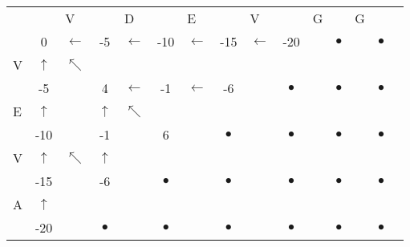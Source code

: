 \documentclass[landscape]{foils}
\begin{document}
\myNewSlide
{
\normalsize
\begin{center}
\begin{tabular}{lclclclclclclcl}
   &              & V             &  & D & & E & & V & & G & & G \\   
   & {\color{black} 0}      & {\color{green}$\leftarrow$}   & -5 &   {\color{green}$\leftarrow$} & -10 &   {\color{green}$\leftarrow$} & -15 &   {\color{green}$\leftarrow$} & -20&    & {\color{black}$\bullet$}&    & {\color{black}$\bullet$} \\
V  & {\color{green} $\uparrow$} & {\color{green}$\nwarrow$}    & {\color{black} $$ } &     & {\color{black} $$ } & {\color{black} $$} &     & {\color{black} $$ } &     & {\color{black} $$ } & {\color{black} $$} &     & {\color{black} $$ } &       \\
   & -5     &  & 4        &   {\color{green}$\leftarrow$} & -1 &   {\color{green} $\leftarrow$} & -6&    & {\color{black}$\bullet$}&    & {\color{black}$\bullet$}&    & {\color{black}$\bullet$} \\
E  & {\color{green} $\uparrow$} &     & {\color{green} $\uparrow$ } & {\color{green}$\nwarrow$}    & {\color{black} $$ } & {\color{black} $$} &     & {\color{black} $$ } &     & {\color{black} $$ } & {\color{black} $$} &     & {\color{black} $$ } &       \\
   & -10 &    & -1        &    & 6 &    & {\color{black}$\bullet$}&    & {\color{black}$\bullet$}&    & {\color{black}$\bullet$}&    & {\color{black}$\bullet$} \\
V  & {\color{green} $\uparrow$} & {\color{green} $\nwarrow$}    & {\color{green} $\uparrow$} &     & {\color{black} $$ } & {\color{black} $$} &     & {\color{black} $$ } &     & {\color{black} $$ } & {\color{black} $$} &     & {\color{black} $$ } &       \\
   & -15      &    & -6        &    & {\color{black}$\bullet$} &    & {\color{black}$\bullet$}&    & {\color{black}$\bullet$}&    & {\color{black}$\bullet$}&    & {\color{black}$\bullet$} \\
A  & {\color{green} $\uparrow$} &     & {\color{black} $$ } &     & {\color{black} $$ } & {\color{black} $$} &     & {\color{black} $$ } &     & {\color{black} $$ } & {\color{black} $$} &     & {\color{black} $$ } &       \\
   & -20      &    & {\color{black} $\bullet$}        &    & {\color{black}$\bullet$} &    & {\color{black}$\bullet$}&    & {\color{black}$\bullet$}&    & {\color{black}$\bullet$}&    & {\color{black}$\bullet$} \\

\end{tabular}
\end{center}}
\end{document}
